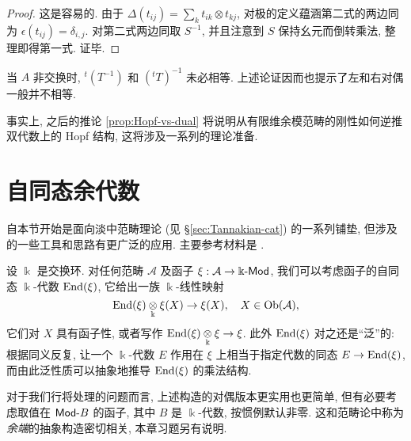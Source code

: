 \begin{proof}
	这是容易的. 由于 $\Delta(t_{ij}) = \sum_k t_{ik} \otimes t_{kj}$, 对极的定义蕴涵第二式的两边同为 $\epsilon(t_{ij}) = \delta_{i, j}$. 对第二式两边同取 $S^{-1}$, 并且注意到 $S$ 保持幺元而倒转乘法, 整理即得第一式. 证毕.
\end{proof}

当 $A$ 非交换时, ${}^t (T^{-1})$ 和 $({}^t T)^{-1}$ 未必相等. 上述论证因而也提示了左和右对偶一般并不相等.

事实上, 之后的推论 \ref{prop:Hopf-vs-dual} 将说明从有限维余模范畴的刚性如何逆推双代数上的 Hopf 结构, 这将涉及一系列的理论准备.

\section{自同态余代数}\label{sec:coend}
自本节开始是面向淡中范畴理论 (见 \S\ref{sec:Tannakian-cat}) 的一系列铺垫, 但涉及的一些工具和思路有更广泛的应用. 主要参考材料是 \cite{Del90}.

设 $\Bbbk$ 是交换环. 对任何范畴 $\mathcal{A}$ 及函子 $\xi: \mathcal{A} \to \Bbbk\text{-}\mathsf{Mod}$, 我们可以考虑函子的自同态 $\Bbbk$-代数 $\operatorname{End}(\xi)$, 它给出一族 $\Bbbk$-线性映射
\[ \operatorname{End}(\xi) \underset{\Bbbk}{\otimes} \xi(X) \to \xi(X), \quad X \in \operatorname{Ob}(\mathcal{A}), \]
它们对 $X$ 具有函子性, 或者写作 $\operatorname{End}(\xi) \underset{\Bbbk}{\otimes} \xi \to \xi$. 此外 $\operatorname{End}(\xi)$ 对之还是``泛''的: 根据同义反复, 让一个 $\Bbbk$-代数 $E$ 作用在 $\xi$ 上相当于指定代数的同态 $E \to \operatorname{End}(\xi)$, 而由此泛性质可以抽象地推导 $\operatorname{End}(\xi)$ 的乘法结构.

对于我们行将处理的问题而言, 上述构造的对偶版本更实用也更简单, 但有必要考虑取值在 $\mathsf{Mod}\text{-}B$ 的函子, 其中 $B$ 是 $\Bbbk$-代数, 按惯例默认非零. 这和范畴论中称为\emph{余端}的抽象构造密切相关, 本章习题另有说明.

